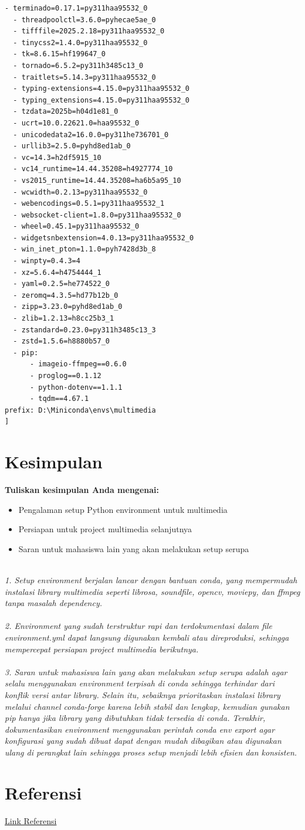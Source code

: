 \documentclass[11pt,a4paper]{article}
\begin{document}
\begin{lstlisting}[caption=Environment/Requirements file]
  - terminado=0.17.1=py311haa95532_0
  - threadpoolctl=3.6.0=pyhecae5ae_0
  - tifffile=2025.2.18=py311haa95532_0
  - tinycss2=1.4.0=py311haa95532_0
  - tk=8.6.15=hf199647_0
  - tornado=6.5.2=py311h3485c13_0
  - traitlets=5.14.3=py311haa95532_0
  - typing-extensions=4.15.0=py311haa95532_0
  - typing_extensions=4.15.0=py311haa95532_0
  - tzdata=2025b=h04d1e81_0
  - ucrt=10.0.22621.0=haa95532_0
  - unicodedata2=16.0.0=py311he736701_0
  - urllib3=2.5.0=pyhd8ed1ab_0
  - vc=14.3=h2df5915_10
  - vc14_runtime=14.44.35208=h4927774_10
  - vs2015_runtime=14.44.35208=ha6b5a95_10
  - wcwidth=0.2.13=py311haa95532_0
  - webencodings=0.5.1=py311haa95532_1
  - websocket-client=1.8.0=py311haa95532_0
  - wheel=0.45.1=py311haa95532_0
  - widgetsnbextension=4.0.13=py311haa95532_0
  - win_inet_pton=1.1.0=pyh7428d3b_8
  - winpty=0.4.3=4
  - xz=5.6.4=h4754444_1
  - yaml=0.2.5=he774522_0
  - zeromq=4.3.5=hd77b12b_0
  - zipp=3.23.0=pyhd8ed1ab_0
  - zlib=1.2.13=h8cc25b3_1
  - zstandard=0.23.0=py311h3485c13_3
  - zstd=1.5.6=h8880b57_0
  - pip:
      - imageio-ffmpeg==0.6.0
      - proglog==0.1.12
      - python-dotenv==1.1.1
      - tqdm==4.67.1
prefix: D:\Miniconda\envs\multimedia
]
\end{lstlisting}

\section{Kesimpulan}
\textbf{Tuliskan kesimpulan Anda mengenai:}
\begin{itemize}
    \item Pengalaman setup Python environment untuk multimedia
    \item Persiapan untuk project multimedia selanjutnya
    \item Saran untuk mahasiswa lain yang akan melakukan setup serupa
\end{itemize}

\textit{\\1. Setup environment berjalan lancar dengan bantuan conda, yang mempermudah instalasi library multimedia seperti librosa, soundfile, opencv, moviepy, dan ffmpeg tanpa masalah dependency. \\
}
\textit{\\2. Environment yang sudah terstruktur rapi dan terdokumentasi dalam file environment.yml dapat langsung digunakan kembali atau direproduksi, sehingga mempercepat persiapan project multimedia berikutnya. \\
}
\textit{\\3. Saran untuk mahasiswa lain yang akan melakukan setup serupa adalah agar selalu menggunakan environment terpisah di conda sehingga terhindar dari konflik versi antar library. Selain itu, sebaiknya prioritaskan instalasi library melalui channel conda-forge karena lebih stabil dan lengkap, kemudian gunakan pip hanya jika library yang dibutuhkan tidak tersedia di conda. Terakhir, dokumentasikan environment menggunakan perintah conda env export agar konfigurasi yang sudah dibuat dapat dengan mudah dibagikan atau digunakan ulang di perangkat lain sehingga proses setup menjadi lebih efisien dan konsisten.
}

\section{Referensi}
\href{https://chatgpt.com/share/68b1c584-4bec-8003-93e8-a874f66dc8d0}{Link Referensi}
\end{document}
